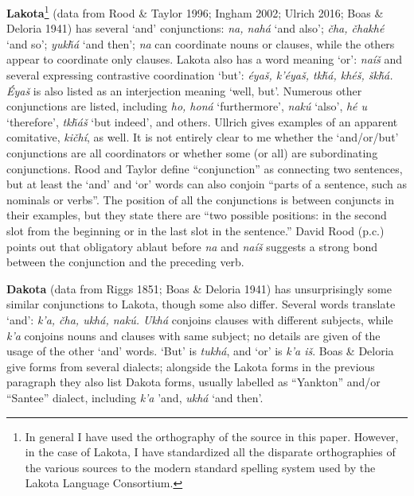 \documentclass[output=paper]{LSP/langsci}
\begin{document}
\textbf{Lakota}\footnote{In general I have used the orthography of the source in this paper. However, in the case of Lakota, I have
standardized all the disparate orthographies of the various sources to the modern standard spelling system used by the Lakota Language Consortium.} (data from Rood \& Taylor 1996; Ingham 2002; Ulrich 2016; Boas \& Deloria 1941) has several `and' conjunctions: \textit{na, nah\'a} `and also'; \textit{\v{c}ha, \v{c}hakh\'e} `and so'; \textit{yuk\v{h}\'a} `and then'; \textit{na} can coordinate nouns or clauses, while the others appear to coordinate only clauses. Lakota also has a word meaning `or': \textit{na\'i\v{s}} and several expressing contrastive coordination `but': \textit{\'eya\v{s}, k'\'eya\v{s}, tk\v{h}\'a, kh\'e\v{s}, \v{s}k\v{h}\'a. \'Eya\v{s}} is also listed as an interjection meaning `well, but'. Numerous other conjunctions are listed, including \textit{ho, hon\'a} `furthermore', \textit{nak\'u} `also', \textit{h\'e u} `therefore', \textit{tk\v{h}\'a\v{s}} `but indeed', and others. Ullrich gives examples of an apparent comitative, \textit{ki\v{c}h\'i}, as well. It is not entirely clear to me whether the `and/or/but' conjunctions are all coordinators or whether some (or all) are subordinating conjunctions. Rood and Taylor define ``conjunction'' as connecting two sentences, but at least the `and' and `or' words can also conjoin ``parts of a sentence, such as nominals or verbs''. The position of all the conjunctions is between conjuncts in their examples, but they state there are ``two possible positions: in the second slot from the beginning or in the last slot in the sentence.'' David Rood (p.c.) points out that obligatory ablaut before \textit{na} and \textit{na\'i\v{s}} suggests a strong bond between the conjunction and the preceding verb.

\textbf{Dakota} (data from Riggs 1851; Boas \& Deloria 1941) has unsurprisingly some similar conjunctions to Lakota, though some also differ. Several words translate `and': \textit{k'a, \v{c}ha, ukh\'a, nak\'u. Ukh\'a} conjoins clauses with different subjects, while \textit{k'a} conjoins nouns and clauses with same subject; no details are given of the usage of the other `and' words. `But' is \textit{tukh\'a}, and `or' is \textit{k'a i\v{s}}. Boas \& Deloria give forms from several dialects; alongside the Lakota forms in the previous paragraph they also list Dakota forms, usually labelled as ``Yankton'' and/or ``Santee'' dialect, including \textit{k'a} 'and, \textit{ukh\'a} `and then'.     
\end{document}

